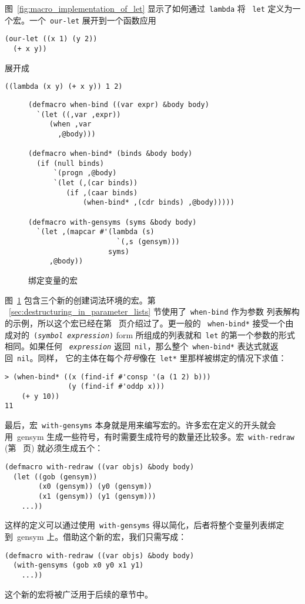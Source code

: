 图~\ref{fig:macro_implementation_of_let} 显示了如何通过~\texttt{lambda} 将
~\texttt{let} 定义为一个宏。一个~\texttt{our-let} 展开到一个函数应用\pozhehao{}
\begin{lstlisting}
(our-let ((x 1) (y 2))
  (+ x y))
\end{lstlisting}
展开成
\begin{lstlisting}
((lambda (x y) (+ x y)) 1 2)
\end{lstlisting}

\begin{figure}
\begin{lstlisting}
(defmacro when-bind ((var expr) &body body)
  `(let ((,var ,expr))
     (when ,var
       ,@body)))

(defmacro when-bind* (binds &body body)
  (if (null binds)
      `(progn ,@body)
      `(let (,(car binds))
         (if ,(caar binds)
             (when-bind* ,(cdr binds) ,@body)))))

(defmacro with-gensyms (syms &body body)
  `(let ,(mapcar #'(lambda (s)
                     `(,s (gensym)))
                   syms)
     ,@body))
\end{lstlisting}
  \caption{绑定变量的宏}
  \label{fig:macros_which_bind_variables}
\end{figure}

图~\ref{fig:macros_which_bind_variables} 包含三个新的创建词法环境的宏。第
~\ref{sec:destructuring_in_parameter_lists} 节使用了~\texttt{when-bind} 作为参数
列表解构的示例，所以这个宏已经在第~\pageref{mac:when_bind} 页介绍过了。更一般的
~\texttt{when-bind*} 接受一个由成对的~\texttt{(\emph{symbol}
\emph{expression})} form 所组成的列表\pozhehao{}就和~\texttt{let} 的第一个参数的形式相同。如果任何
~\texttt{\emph{expression}}
返回~\texttt{nil}，那么整个~\texttt{when-bind*} 表达式就返回~\texttt{nil}。同样，
它的主体在每个\emph{符号}像在~\texttt{let*} 里那样被绑定的情况下求值：
\begin{lstlisting}
> (when-bind* ((x (find-if #'consp '(a (1 2) b)))
               (y (find-if #'oddp x)))
    (+ y 10))
11
\end{lstlisting}

最后，宏~\texttt{with-gensyms} 本身就是用来编写宏的。许多宏在定义的开头就会用~gensym 生成一些符号，有时需要生成符号的数量还比较多。宏~\texttt{with-redraw} (第~\pageref{mac:with-redraw} 页) 就必须生成五个：
\begin{lstlisting}
(defmacro with-redraw ((var objs) &body body)
  (let ((gob (gensym))
        (x0 (gensym)) (y0 (gensym))
        (x1 (gensym)) (y1 (gensym)))
    ...))
\end{lstlisting}
这样的定义可以通过使用~\texttt{with-gensyms} 得以简化，后者将整个变量列表绑定到~gensym 上。借助这个新的宏，我们只需写成：
\begin{lstlisting}
(defmacro with-redraw ((var objs) &body body)
  (with-gensyms (gob x0 y0 x1 y1)
    ...))
\end{lstlisting}
这个新的宏将被广泛用于后续的章节中。


